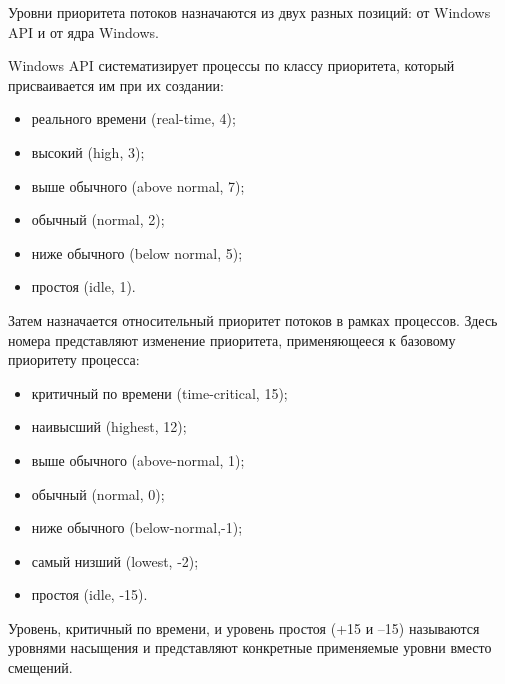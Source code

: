 Уровни приоритета потоков назначаются из двух разных позиций: от Windows API и от ядра Windows.

Windows API систематизирует процессы по классу приоритета, который присваивается им при их создании:
\begin{itemize}[label=---]
	\item реального времени (real-time, 4);
	\item высокий (high, 3);
	\item выше обычного (above normal, 7);
	\item обычный (normal, 2);
	\item ниже обычного (below normal, 5);
	\item простоя (idle, 1).
\end{itemize}

Затем назначается относительный приоритет потоков в рамках процессов. Здесь номера представляют изменение приоритета, применяющееся к базовому приоритету процесса:
\begin{itemize}[label=---]
	\item критичный по времени (time-critical, 15);
	\item наивысший (highest, 12);
	\item выше обычного (above-normal, 1);
	\item обычный (normal, 0);
	\item ниже обычного (below-normal,-1);
	\item самый низший (lowest, -2);
	\item простоя (idle, -15).
\end{itemize}

Уровень, критичный по времени, и уровень простоя (+15 и –15) называются уровнями насыщения и представляют конкретные применяемые уровни вместо смещений.

